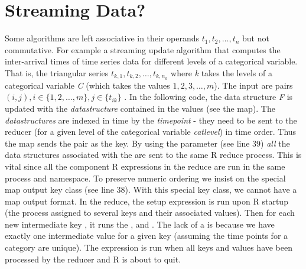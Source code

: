 \documentclass[letterpaper,10pt,english]{sphinxmanual}
\begin{document}
\section{Streaming Data?}
\label{airline:id6}\label{airline:streaming-data}
Some algorithms are left associative in their operands
$t_1,t_2,\ldots,t_n$ but not commutative. For example a streaming update
algorithm that computes the inter-arrival times of time series data for
different levels of a categorical variable. That is, the triangular series
$t_{k,1},t_{k,2},\ldots,t_{k,n_k}$ where \emph{k} takes the levels of a
categorical variable \emph{C} (which takes the values $1,2,3,\ldots,m$). The
input are pairs $(i,j), i \in \{1,2,\ldots,m\}, j \in \{t_{ik}\}$
. In the following code, the data structure \emph{F} is updated with the
\emph{datastructure} contained in the values (see the map). The \emph{datastructures}
are indexed in time by the \emph{timepoint} - they need to be sent to the reducer
(for a given level of the categorical variable \emph{catlevel}) in time order. Thus
the map sends the pair  as the key. By using the
 parameter (see line 39) \emph{all} the data structures associated with the 
are sent to the same R reduce process. This is vital since all the component
R expressions in the reduce are run in the same process and namespace. To
preserve numeric ordering we insist on the special map output key class (see
line 38). With this special key class, we cannot have a map output format.
In the reduce, the setup expression  is run upon R startup (the
process assigned to several keys and their associated values). Then for each new
intermediate key , it runs the ,  and
. The lack of a  is because we have exactly one intermediate
value for a given key (assuming the time points for a category are unique).
The  expression is run when all keys and values have been processed
by the reducer and R is about to quit.
\end{document}
